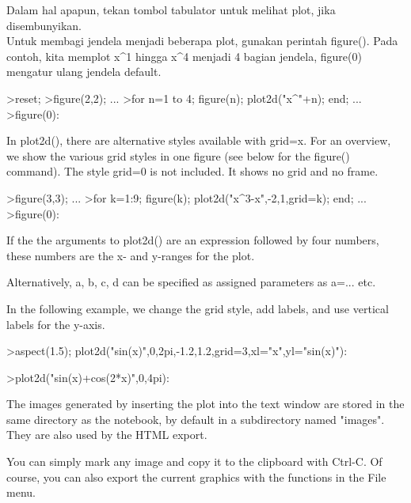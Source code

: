 \documentclass{article}
\begin{document}
\begin{eulernotebook}
\begin{eulercomment}
\begin{eulercomment}
\begin{eulercomment}
\begin{eulercomment}
\begin{eulercomment}
\begin{eulercomment}
\begin{eulercomment}
Dalam hal apapun, tekan tombol tabulator untuk melihat plot, jika
disembunyikan.\\
Untuk membagi jendela menjadi beberapa plot, gunakan perintah
figure(). Pada contoh, kita memplot x\textasciicircum{}1 hingga x\textasciicircum{}4 menjadi 4 bagian
jendela, figure(0) mengatur ulang jendela default.
\end{eulercomment}
\begin{eulerprompt}
>reset;
>figure(2,2); ...
>for n=1 to 4; figure(n); plot2d("x^"+n); end; ...
>figure(0):
\end{eulerprompt}
\begin{eulercomment}
In plot2d(), there are alternative styles available with grid=x. For an overview, we
show the various grid styles in one figure (see below for the figure() command). The
style grid=0 is not included. It shows no grid and no frame.
\end{eulercomment}
\begin{eulerprompt}
>figure(3,3); ...
>for k=1:9; figure(k); plot2d("x^3-x",-2,1,grid=k); end; ...
>figure(0):
\end{eulerprompt}
\begin{eulercomment}
If the the arguments to plot2d() are an expression followed by four numbers, these
numbers are the x- and y-ranges for the plot.

Alternatively, a, b, c, d can be specified as assigned parameters as a=... etc.

In the following example, we change the grid style, add labels, and use vertical labels
for the y-axis.
\end{eulercomment}
\begin{eulerprompt}
>aspect(1.5); plot2d("sin(x)",0,2pi,-1.2,1.2,grid=3,xl="x",yl="sin(x)"):
\end{eulerprompt}
\begin{eulerprompt}
>plot2d("sin(x)+cos(2*x)",0,4pi):
\end{eulerprompt}
\begin{eulercomment}
The images generated by inserting the plot into the text window are stored in the same
directory as the notebook, by default in a subdirectory named "images". They are also
used by the HTML export.

You can simply mark any image and copy it to the clipboard with Ctrl-C. Of course, you
can also export the current graphics with the functions in the File menu.


\end{eulercomment}
\end{eulercomment}
\end{eulercomment}
\end{eulercomment}
\end{eulercomment}
\end{eulercomment}
\end{eulercomment}
\end{eulernotebook}
\end{document}
